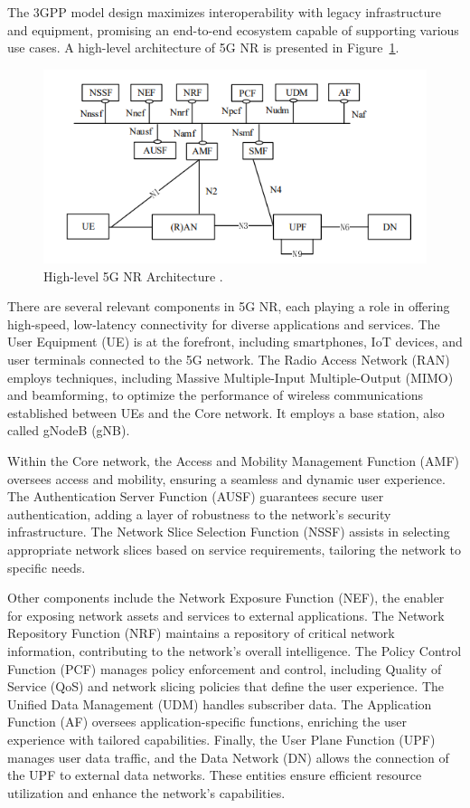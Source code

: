 The 3GPP model design maximizes interoperability with legacy infrastructure and equipment, promising an end-to-end ecosystem capable of supporting various use cases.
A high-level architecture of 5G NR is presented in Figure~\ref{fig:5G_arch}.

\begin{figure}[H]
    \centering
    \includegraphics[width=0.7\linewidth]{figures/5g NR}
    \caption[High-level 5G NR Architecture]{High-level 5G NR Architecture \cite{ETSI_5G_NR}.}
    \label{fig:5G_arch}
\end{figure}

There are several relevant components in 5G NR, each playing a role in offering high-speed, low-latency connectivity for diverse applications and services.
The User Equipment (UE) is at the forefront, including smartphones, IoT devices, and user terminals connected to the 5G network.
The Radio Access Network (RAN) employs techniques, including Massive Multiple-Input Multiple-Output (MIMO) and beamforming, to optimize the performance of wireless communications established between UEs and the Core network.
It employs a base station, also called gNodeB (gNB).

Within the Core network, the Access and Mobility Management Function (AMF) oversees access and mobility, ensuring a seamless and dynamic user experience.
The Authentication Server Function (AUSF) guarantees secure user authentication, adding a layer of robustness to the network's security infrastructure.
The Network Slice Selection Function (NSSF) assists in selecting appropriate network slices based on service requirements, tailoring the network to specific needs.

Other components include the Network Exposure Function (NEF), the enabler for exposing network assets and services to external applications.
The Network Repository Function (NRF) maintains a repository of critical network information, contributing to the network's overall intelligence.
The Policy Control Function (PCF) manages policy enforcement and control, including Quality of Service (QoS) and network slicing policies that define the user experience.
The Unified Data Management (UDM) handles subscriber data.
The Application Function (AF) oversees application-specific functions, enriching the user experience with tailored capabilities.
Finally, the User Plane Function (UPF) manages user data traffic, and the Data Network (DN) allows the connection of the UPF to external data networks.
These entities ensure efficient resource utilization and enhance the network's capabilities.

